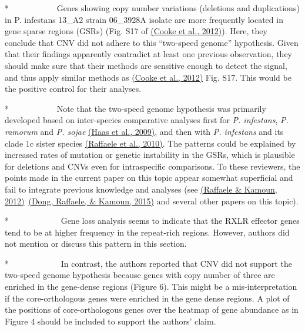 \documentclass[10pt]{article}
\begin{document}
\par\null

*~~~~~~~~~~~ Genes showing copy number variations (deletions and
duplications) in P. infestans 13\_A2 strain 06\_3928A isolate are more
frequently located in gene sparse regions (GSRs) (Fig. S17 of
\hyperref[csl:3]{(Cooke et al., 2012)}). Here, they conclude that CNV did not adhere to this
``two-speed genome'' hypothesis. Given that their findings apparently
contradict at least one previous observation, they should make sure that
their methods are sensitive enough to detect the signal, and thus apply
similar methods as \hyperref[csl:3]{(Cooke et al., 2012)} Fig. S17. This would be the
positive control for their analyses.

\par\null

*~~~~~~~~~~~ Note that the two-speed genome hypothesis was primarily
developed based on inter-species comparative analyses first for \emph{P.
infestans}, \emph{P. ramorum} and \emph{P. sojae} \hyperref[csl:5]{(Haas et al., 2009)},
and then with \emph{P. infestans} and its clade 1c sister species
\hyperref[csl:6]{(Raffaele et al., 2010)}. The patterns could be explained by increased rates
of mutation or genetic instability in the GSRs, which is plausible for
deletions and CNVs even for intraspecific comparisons. To these
reviewers, the points made in the current paper on this topic appear
somewhat superficial and fail to integrate previous knowledge and
analyses (see \hyperref[csl:7]{(Raffaele \& Kamoun, 2012)}~\hyperref[csl:8]{(Dong, Raffaele, \& Kamoun, 2015)} and several other
papers on this topic).

\par\null

*~~~~~~~~~~~~ Gene loss analysis seems to indicate that the RXLR
effector genes tend to be at higher frequency in the repeat-rich
regions. However, authors did not mention or discuss this pattern in
this section.

\par\null

*~~~~~~~~~~~~ In contrast, the authors reported that CNV did not support
the two-speed genome hypothesis because genes with copy number of three
are enriched in the gene-dense regions (Figure 6). This might be a
mis-interpretation if the core-orthologous genes were enriched in the
gene dense regions. A plot of the positions of core-orthologous genes
over the heatmap of gene abundance as in Figure 4 should be included to
support the authors' claim.
\end{document}
